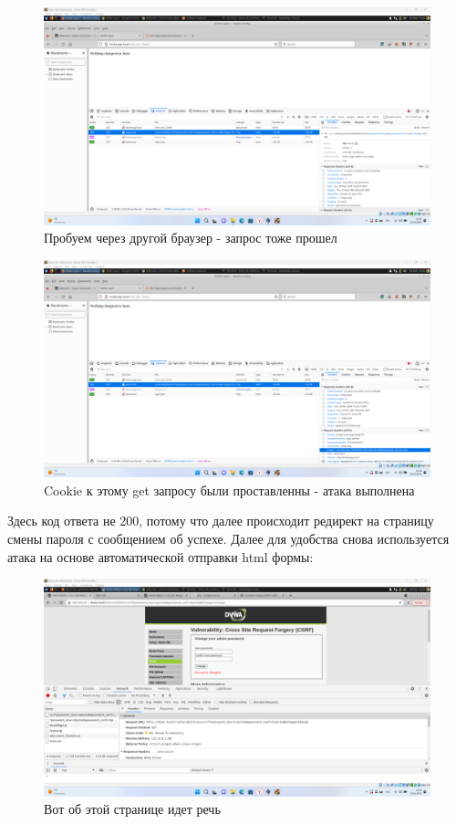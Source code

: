 \documentclass[a4paper]{article}
\begin{document}
  \begin{figure}[H]
    \centering
    \includegraphics[width=\textwidth]{Screenshot_102}
    \caption{Пробуем через другой браузер - запрос тоже прошел}
  \end{figure}

  \begin{figure}[H]
    \centering
    \includegraphics[width=\textwidth]{Screenshot_103}
    \caption{Cookie к этому get запросу были проставленны - атака выполнена}
  \end{figure}

  Здесь код ответа не 200, потому что далее происходит редирект на страницу смены пароля с сообщением об успехе.
  Далее для удобства снова используется атака на основе автоматической отправки html формы:

  \begin{figure}[H]
    \centering
    \includegraphics[width=\textwidth]{Screenshot_105}
    \caption{Вот об этой странице идет речь}
  \end{figure}
\end{document}
